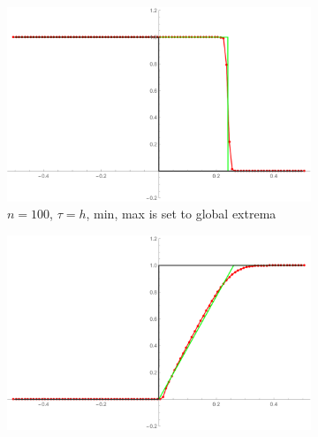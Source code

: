 \documentclass{article}
\begin{document}
\begin{figure}[h!]
	\begin{subfigure}{.5\textwidth}
		\centering
		\includegraphics[width=\textwidth]{travel}
		\caption{$ n = 100 $, $ \tau = h $, min, max is set to global extrema}
	\end{subfigure}
	\begin{subfigure}{.5\textwidth}
		\centering
		\includegraphics[width=\textwidth]{rare}
	\end{subfigure}
\end{figure}
\end{document}
